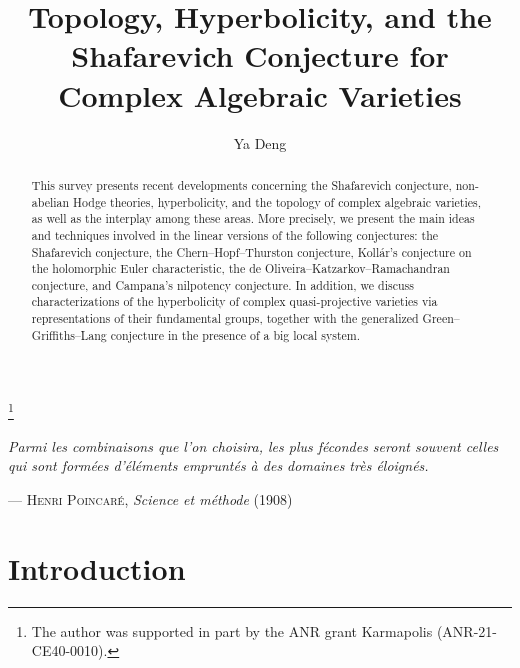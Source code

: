 \documentclass[english]{amsproc}
\theoremstyle{plain}
\theoremstyle{definition}
\theoremstyle{remark}
\theoremstyle{plain}
\numberwithin{equation}{thm} %
\begin{document}
 \title[Topology \& Hyperbolicity of Algebraic Varieties]{Topology, Hyperbolicity, and the Shafarevich Conjecture for Complex Algebraic Varieties}
	
	
	
	\author[Ya Deng]{Ya Deng}
	
	
	\address{CNRS,  
		Institut de Math\'ematiques de Jussieu-Paris Rive Gauche,
		Sorbonne Universit\'e, Campus Pierre et Marie Curie,
		4 place Jussieu, 75252 Paris Cedex 05, France}
	\thanks{The  author was supported in part by  the ANR grant Karmapolis (ANR-21-CE40-0010).}
	
{}
	\begin{abstract}
This survey presents recent developments concerning the Shafarevich conjecture, non-abelian Hodge theories, hyperbolicity, and the topology of complex algebraic varieties, as well as the interplay among these areas. 
More precisely, we present the main ideas and techniques involved in the linear versions of the following conjectures: the Shafarevich conjecture, the Chern–Hopf–Thurston conjecture, Kollár’s conjecture on the holomorphic Euler characteristic, the de Oliveira–Katzarkov–Ramachandran conjecture, and Campana’s nilpotency conjecture. In addition, we  discuss characterizations of the hyperbolicity of complex quasi-projective varieties via representations of their fundamental groups, together with  the generalized Green–Griffiths–Lang conjecture   in the presence of a big local system.
	\end{abstract}
	\maketitle
\epigraph{\textit{Parmi les combinaisons que l'on choisira, les plus fécondes seront souvent celles qui sont formées d'éléments empruntés à des domaines très éloignés.}}
{--- \textsc{Henri Poincaré}, \textit{Science et méthode} (1908)}
	\tableofcontents
	\section{Introduction}  
\end{document}
